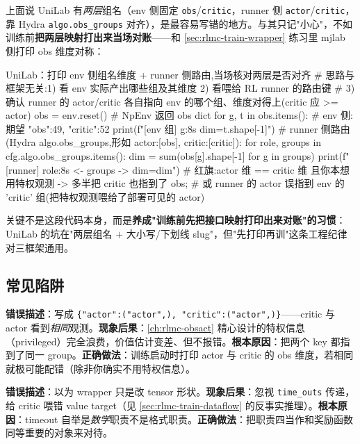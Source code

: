 \begin{note}
上面说 UniLab 有\emph{两层}组名（env 侧固定 \verb|obs|/\verb|critic|，runner 侧 \verb|actor|/\verb|critic|，靠 Hydra \verb|algo.obs_groups| 对齐），是最容易写错的地方。与其只记"小心"，不如训练前\textbf{把两层映射打出来当场对账}——和 \cref{sec:rlmc-train-wrapper} 练习里 mjlab 侧打印 obs 维度对称：
\begin{codebox}[Python]{UniLab：打印 env 侧组名维度 + runner 侧路由,当场核对两层是否对齐}
# 思路与框架无关:1) 看 env 实际产出哪些组及其维度 2) 看喂给 RL runner 的路由键
# 3) 确认 runner 的 actor/critic 各自指向 env 的哪个组、维度对得上(critic 应 >= actor)
obs = env.reset()                                  # NpEnv 返回 obs dict
for g, t in obs.items():                            # env 侧:期望 {"obs":49, "critic":52}
    print(f"[env 组] {g:8s} dim={t.shape[-1]}")
# runner 侧路由(Hydra algo.obs_groups,形如 {actor:[obs], critic:[critic]}):
for role, groups in cfg.algo.obs_groups.items():
    dim = sum(obs[g].shape[-1] for g in groups)
    print(f"[runner] {role:8s} <- {groups}  -> dim={dim}")
# 红旗:actor 维 == critic 维 且你本想用特权观测 -> 多半把 critic 也指到了 obs;
#       或 runner 的 actor 误指到 env 的 'critic' 组(把特权观测喂给了部署可见的 actor)
\end{codebox}
关键不是这段代码本身，而是\textbf{养成"训练前先把接口映射打印出来对账"的习惯}：UniLab 的坑在"两层组名 $+$ 大小写/下划线 slug"，但"先打印再训"这条工程纪律对三框架通用。
\end{note}

\subsection{常见陷阱}

\begin{pitfall}
\textbf{错误描述}：写成 \verb|{"actor":("actor",), "critic":("actor",)}|——critic 与 actor 看到\emph{相同}观测。\textbf{现象后果}：\cref{ch:rlmc-obsact} 精心设计的特权信息（privileged）完全浪费，价值估计变差、但不报错。\textbf{根本原因}：把两个 key 都指到了同一 group。\textbf{正确做法}：训练启动时打印 actor 与 critic 的 obs 维度，若相同就极可能配错（除非你确实不用特权信息）。
\end{pitfall}

\begin{pitfall}
\textbf{错误描述}：以为 wrapper 只是改 tensor 形状。\textbf{现象后果}：忽视 \verb|time_outs| 传递，给 critic 喂错 value target（见 \cref{sec:rlmc-train-dataflow} 的反事实推理）。\textbf{根本原因}：timeout 自举是\emph{数学}职责不是格式职责。\textbf{正确做法}：把职责四当作和奖励函数同等重要的对象来对待。
\end{pitfall}

